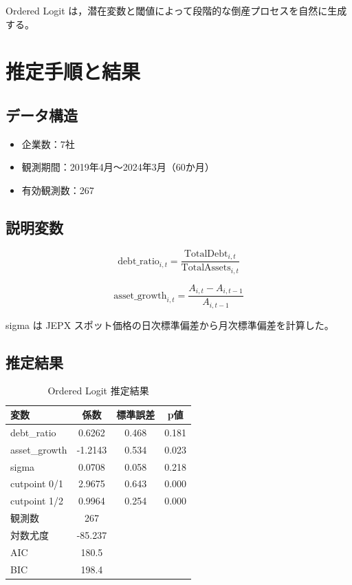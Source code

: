 Ordered Logit は，潜在変数と閾値によって段階的な倒産プロセスを自然に生成する。

\section{推定手順と結果}
\label{sec:estimation}

\subsection{データ構造}

\begin{itemize}
    \item 企業数：7社
    \item 観測期間：2019年4月～2024年3月（60か月）
    \item 有効観測数：267
\end{itemize}

\subsection{説明変数}



\[
\text{debt\_ratio}_{i,t}
=
\frac{\text{TotalDebt}_{i,t}}{\text{TotalAssets}_{i,t}}
\]





\[
\text{asset\_growth}_{i,t}
=
\frac{A_{i,t}-A_{i,t-1}}{A_{i,t-1}}
\]



sigma は JEPX スポット価格の日次標準偏差から月次標準偏差を計算した。

\subsection{推定結果}

\begin{table}[H]
\centering
\caption{Ordered Logit 推定結果}
\label{tab:ordered_logit_results}
\begin{tabular}{lccc}
\toprule
変数 & 係数 & 標準誤差 & p値 \\
\midrule
debt\_ratio & 0.6262 & 0.468 & 0.181 \\
asset\_growth & -1.2143 & 0.534 & 0.023 \\
sigma & 0.0708 & 0.058 & 0.218 \\
\midrule
cutpoint 0/1 & 2.9675 & 0.643 & 0.000 \\
cutpoint 1/2 & 0.9964 & 0.254 & 0.000 \\
\midrule
観測数 & 267 & & \\
対数尤度 & -85.237 & & \\
AIC & 180.5 & & \\
BIC & 198.4 & & \\
\bottomrule
\end{tabular}
\end{table}

